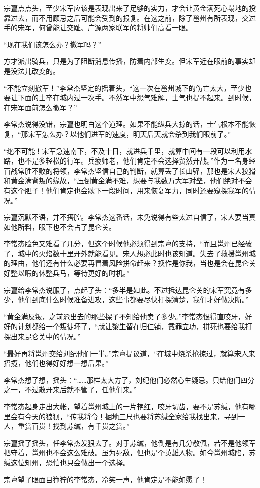 宗亶点点头，至少宋军应该是表现出来了足够的实力，才会让黄金满死心塌地的投靠过去，而不用顾忌之后可能会受到的报复。在这之前，除了邕州有所表现，交过手的宋军，何曾能让交趾、广源两家联军的将帅们高看一眼。

“现在我们该怎么办？撤军吗？”

方才派出骑兵，只是为了阻断消息传播，防着内部生变。但宋军近在眼前的事实却是没法儿改变的。

“不能立刻撤军！”李常杰坚定的摇着头，“这一次在邕州城下的伤亡太大，至少也要让下面的士卒在城内过一次手。不然军中怨气难解，士气也提不起来。到时候，在宋军面前怎么撤军？”

李常杰说得没错，宗亶也明白这个道理。如果不能纵兵大掠的话，士气根本不能恢复，“那宋军怎么办？以他们进军的速度，明天后天就会杀到我们眼前了。”

“绝不可能！宋军急速南下，不及十日，就进兵千里，就算中间有一段可以利用水路，也不是多轻松的行军。兵疲师老，他们肯定不会选择贸然开战。”作为一名身经百战常胜不败的将领，李常杰坚信自己的判断，就算丢了长山驿，那也是宋人狡猾和黄金满背叛的缘故，“压倒黄金满不难，想要与我数万大军对垒，他们绝对不会有这个胆子！他们肯定也会歇下一段时间，用来恢复军力，同时还要窥探我军的情况。”

宗亶沉默不语，并不搭腔。李常杰这番话，未免说得有些太过自信了，宋人要当真如他所料，眼下也不会占了昆仑关。

李常杰脸色又难看了几分，但这个时候他必须得到宗亶的支持，“而且邕州已经破了，城中的火焰数十里开外就能看见。宋人想必此时也该知道。失去了救援邕州城的理由，他们还有什么必要再冒着风险拼命赶来？换作是你我，当也是会在昆仑关好整以暇的休整兵马，等待更好的时机。”

宗亶给李常杰说服了，点起了头：“多半是如此。不过抵达昆仑关的宋军究竟有多少，他们到底什么时候准备进攻，这些事都要尽快打探清楚，我们才好做决断。”

“黄金满反叛，之前派出去的那些探子不知给他卖了多少。”李常杰恨得直咬牙，好好的计划都给一个叛徒坏了，“就让黎生留在归仁铺，戴罪立功，拼死也要给我打探出来昆仑关中的情况。”

“最好再将邕州交给刘纪他们一半。”宗亶提议道，“在城中烧杀抢掠过，就算宋人来招揽，他们也得好好想一想后果。”

李常杰想了想，摇头：“……那样太大方了，刘纪他们必然心生疑忌。只给他们四分之一，不过散开来后就不管了，任他们来。”

李常杰起身走出大帐，望着邕州城上的一片艳红，咬牙切齿，要不是苏缄，他有哪里会有今天的狼狈，“传我将令！掘地三尺也要将苏缄全家给我找出来，寻到一人，重赏百贯！找到苏缄，有千贯之赏。”

宗亶摇了摇头，任李常杰发狠去了。对于苏缄，他倒是有几分敬佩，若不是他领军把守着，邕州也不会这么难破。虽为死敌，但也是个英雄人物。如今邕州城陷，苏缄这位知州，恐怕也只会做出一个选择。

宗亶望了眼面目狰狞的李常杰，冷笑一声，他肯定是不能如愿了！

